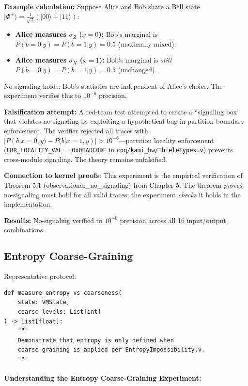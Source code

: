 \textbf{Example calculation:}
Suppose Alice and Bob share a Bell state $|\Phi^+\rangle = \frac{1}{\sqrt{2}}(|00\rangle + |11\rangle)$:
\begin{itemize}
    \item \textbf{Alice measures $\sigma_Z$ ($x=0$):} Bob's marginal is $P(b=0|y) = P(b=1|y) = 0.5$ (maximally mixed).
    \item \textbf{Alice measures $\sigma_X$ ($x=1$):} Bob's marginal is \textit{still} $P(b=0|y) = P(b=1|y) = 0.5$ (unchanged).
\end{itemize}
No-signaling holds: Bob's statistics are independent of Alice's choice. The experiment verifies this to $10^{-6}$ precision.

\textbf{Falsification attempt:} A red-team test attempted to create a ``signaling box'' that violates no-signaling by exploiting a hypothetical bug in partition boundary enforcement. The verifier rejected all traces with $|P(b|x=0,y) - P(b|x=1,y)| > 10^{-6}$---partition locality enforcement (\texttt{ERR\_LOCALITY\_VAL} = \texttt{0x0BADC0DE} in \texttt{coq/kami\_hw/ThieleTypes.v}) prevents cross-module signaling. The theory remains unfalsified.

\textbf{Connection to kernel proofs:} This experiment is the empirical verification of Theorem 5.1 (observational\_no\_signaling) from Chapter 5. The theorem \textit{proves} no-signaling must hold for all valid traces; the experiment \textit{checks} it holds in the implementation.


\textbf{Results:} No-signaling verified to $10^{-6}$ precision across all 16 input/output combinations.

\subsection{Entropy Coarse-Graining}

Representative protocol:
\begin{lstlisting}
def measure_entropy_vs_coarseness(
    state: VMState,
    coarse_levels: List[int]
) -> List[float]:
    """
    Demonstrate that entropy is only defined when
    coarse-graining is applied per EntropyImpossibility.v.
    """
\end{lstlisting}

\paragraph{Understanding the Entropy Coarse-Graining Experiment:}

